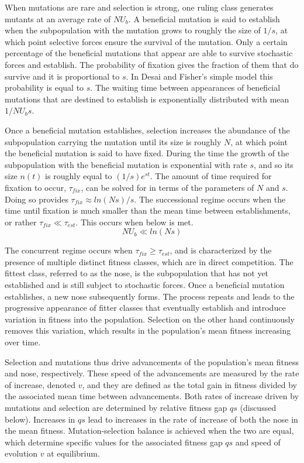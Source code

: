 \documentclass[12pt]{article}
\begin{document}
When mutations are rare and selection is strong, one ruling class generates mutants at an average rate of $N U_b$.  A beneficial mutation is said to establish when the subpopulation with the mutation grows to roughly the size of $1/s$, at which point selective forces ensure the survival of the mutation.  Only a certain percentage of the beneficial mutations that appear are able to survive stochastic forces and establish.  The probability of fixation gives the fraction of them that do survive and it is proportional to $s$.  In Desai and Fisher's simple model this probability is equal to $s$.  The waiting time between appearances of beneficial mutations that are destined to establish is exponentially distributed with mean $1/NU_b s$.  

Once a beneficial mutation establishes, selection increases the abundance of the subpopulation carrying the mutation until its size is roughly $N$, at which point the beneficial mutation is said to have fixed.  During the time the growth of the subpopulation with the beneficial mutation is exponential with rate $s$, and so its   size $n(t)$ is roughly equal to  $(1/s) e^{st}$.  The amount of time required for fixation to occur,  $\tau_{fix}$, can be solved for in terms of the parameters of $N$ and $s$.  Doing so provides $\tau_{fix} \approx ln(Ns)/s$.  The successional regime occurs when the time until fixation is much smaller than the mean time between establishments, or rather $\tau_{fix} \ll \tau_{est}$.  This occurs when below is met.
\[ N U_b \ll ln(Ns) \] 

The concurrent regime occurs when $\tau_{fix} \ge \tau_{est}$, and is characterized by the presence of multiple distinct fitness classes, which are in direct competition.  The fittest class, referred to as the nose, is the subpopulation that has not yet established and is still subject to stochastic forces.  Once a beneficial mutation establishes, a new nose subsequently forms.  The process repeats and leads to the progressive appearance of fitter classes that eventually establish and introduce variation in fitness into the population.  Selection on the other hand continuously removes this variation, which results in the population's mean fitness  increasing over time.  

Selection and mutations thus drive advancements of the population's mean fitness and nose, respectively.  These speed of the advancements are measured by the rate of increase, denoted $v$, and they are defined as the total gain in fitness divided by the associated mean time between advancements.  Both rates of increase driven by mutations and selection are determined by relative fitness gap $qs$ (discussed below).  Increases in $qs$ lead to increases in the rate of increase of both the nose in the mean fitness.  Mutation-selection balance is achieved when the two are equal, which determine specific values for the associated fitness gap $qs$ and speed of evolution $v$ at equilibrium. 
\end{document}
